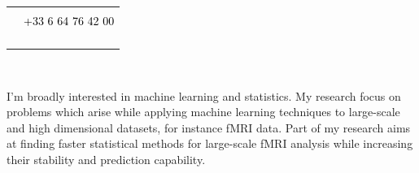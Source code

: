 \documentclass[letterpaper]{article}
\newcommand{\MYhref}[3][black]{\href{#2}{\color{#1}{#3}}}%
\begin{document}
\begin{minipage}[t]{1\linewidth}
\begin{minipage}[t]{0.5\linewidth}
\begin{minipage}{1\linewidth}
\begin{minipage}{1\linewidth}
\begin{tabularx}{1\textwidth}{rX}
				\faMobilePhone& 
				\textcolor{black}{\MYhref{ahoyosidrobo@gmail.com}{ahoyosidrobo@gmail.com}}\\
				\vspace{1ex}
				& \textcolor{black}{+33 6 64 76 42 00}\\				
				\vspace{1ex}
				\faHome    & 
				\textcolor{black}{\MYhref{https://ahoyosid.github.io/}{https://ahoyosid.github.io/}}\\
				\vspace{1ex}
				\faTwitter & 
				\textcolor{black}{\MYhref{twitter.com/ahoyosid}{twitter.com/ahoyosid}}\\
				\vspace{1ex}
				\faGithub  & 
				\textcolor{black}{\MYhref{github.com/ahoyosid}{github.com/ahoyosid}}\\
				\vspace{1ex}
				\faLinkedin & 
				\textcolor{black}{\MYhref{linkedin.com/in/andres-hoyos-idroboi-85b42024}{linkedin.com/in/andres-hoyos-idroboi-85b42024}}\\
			\end{tabularx}
		\end{minipage} 
	\end{minipage} %
	\begin{minipage}{1\linewidth} %
		\vspace{2ex}
		\begin{minipage}{1\linewidth}
			\\
		\end{minipage}
		\begin{minipage}{1\linewidth}
			\vspace{2ex}
			{\normalsize I'm broadly interested in machine learning and 
			statistics. 
			My research focus on problems which arise while applying machine 	
			learning techniques to large-scale and high dimensional datasets,	
			for instance fMRI data. 
			Part of my research aims at finding faster statistical methods for 	
			large-scale	fMRI analysis while increasing their stability and 		
			prediction capability.\\
			
}
\end{minipage}
\end{minipage}
\end{minipage}
\end{minipage}
\end{document}
